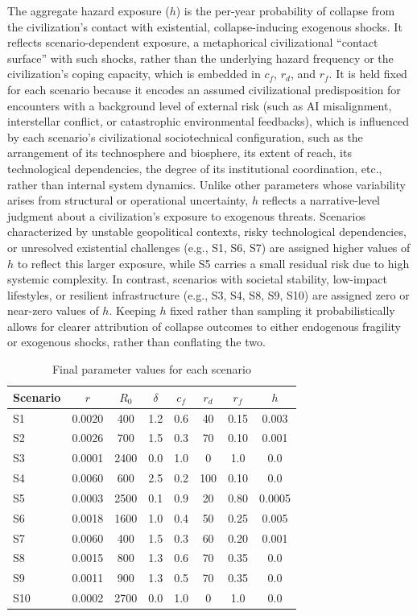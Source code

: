 The aggregate hazard exposure (\(h\)) is the per-year probability of collapse from the civilization's contact with existential, collapse-inducing exogenous shocks. It reflects scenario-dependent exposure, a metaphorical civilizational ``contact surface'' with such shocks, rather than the underlying hazard frequency or the civilization's coping capacity, which is embedded in $c_f$, $r_d$, and $r_f$. It is held fixed for each scenario because it encodes an assumed civilizational predisposition for encounters with a background level of external risk (such as AI misalignment, interstellar conflict, or catastrophic environmental feedbacks), which is influenced by each scenario's civilizational sociotechnical configuration, such as the arrangement of its technosphere and biosphere, its extent of reach, its technological dependencies, the degree of its institutional coordination, etc., rather than internal system dynamics. Unlike other parameters whose variability arises from structural or operational uncertainty, \(h\) reflects a narrative-level judgment about a civilization's exposure to exogenous threats. Scenarios characterized by unstable geopolitical contexts, risky technological dependencies, or unresolved existential challenges (e.g., S1, S6, S7) are assigned higher values of $h$ to reflect this larger exposure, while S5 carries a small residual risk due to high systemic complexity. In contrast, scenarios with societal stability, low-impact lifestyles, or resilient infrastructure (e.g., S3, S4, S8, S9, S10) are assigned zero or near-zero values of $h$. Keeping \(h\) fixed rather than sampling it probabilistically allows for clearer attribution of collapse outcomes to either endogenous fragility or exogenous shocks, rather than conflating the two.

\begin{table}[htbp]
\centering
\caption{Final parameter values for each scenario}
\label{tab:params}
\begin{tabular}{lccccccc}
\toprule
Scenario & $r$ & $R_0$ & $\delta$ & $c_f$ & $r_d$ & $r_f$ & $h$ \\
\midrule
S1 & 0.0020 & 400 & 1.2 & 0.6 & 40 & 0.15 & 0.003 \\
S2 & 0.0026 & 700 & 1.5 & 0.3 & 70 & 0.10 & 0.001 \\
S3 & 0.0001 & 2400 & 0.0 & 1.0 & 0 & 1.0 & 0.0 \\
S4 & 0.0060 & 600 & 2.5 & 0.2 & 100 & 0.10 & 0.0 \\
S5 & 0.0003 & 2500 & 0.1 & 0.9 & 20 & 0.80 & 0.0005 \\
S6 & 0.0018 & 1600 & 1.0 & 0.4 & 50 & 0.25 & 0.005 \\
S7 & 0.0060 & 400 & 1.5 & 0.3 & 60 & 0.20 & 0.001 \\
S8 & 0.0015 & 800 & 1.3 & 0.6 & 70 & 0.35 & 0.0 \\
S9 & 0.0011 & 900 & 1.3 & 0.5 & 70 & 0.35 & 0.0 \\
S10 & 0.0002 & 2700 & 0.0 & 1.0 & 0 & 1.0 & 0.0 \\
\bottomrule
\end{tabular}
\end{table}

